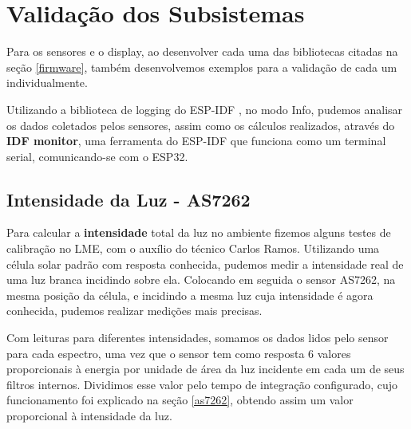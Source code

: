 \documentclass[../monografia.tex]{subfiles}
\begin{document}


\section{Validação dos Subsistemas} %

Para os sensores e o display, ao desenvolver cada uma das bibliotecas citadas na seção \ref{firmware}, também desenvolvemos exemplos para a validação de cada um individualmente. 

Utilizando a biblioteca de logging do ESP-IDF \cite{log-esp}, no modo Info, pudemos analisar os dados coletados pelos sensores, assim como os cálculos realizados, através do \textbf{IDF monitor}, uma ferramenta do ESP-IDF que funciona como um terminal serial, comunicando-se com o ESP32. 

\subsection{Intensidade da Luz - AS7262}

Para calcular a \textbf{intensidade} total da luz no ambiente fizemos alguns testes de calibração no LME, com o auxílio do técnico Carlos Ramos. Utilizando uma célula solar padrão com resposta conhecida, pudemos medir a intensidade real de uma luz branca incidindo sobre ela. Colocando em seguida o sensor AS7262, na mesma posição da célula, e incidindo a mesma luz cuja intensidade é agora conhecida, pudemos realizar medições mais precisas. 

Com leituras para diferentes intensidades, somamos os dados lidos pelo sensor para cada espectro, uma vez que o sensor tem como resposta 6 valores proporcionais à energia por unidade de área da luz incidente em cada um de seus filtros internos. 
Dividimos esse valor pelo tempo de integração configurado, cujo funcionamento foi explicado na seção \ref{as7262}, obtendo assim um valor proporcional à intensidade da luz. 	
\end{document}
